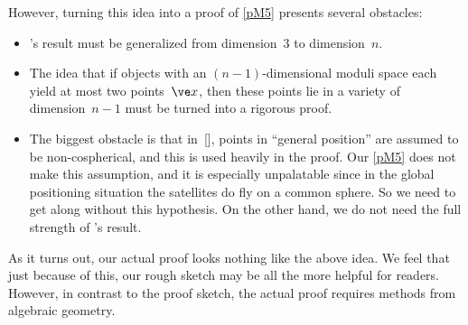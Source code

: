 \documentclass[reqno]{amsart}
\begin{document}
However, turning this idea into a proof of \cref{pM5} presents several
obstacles:

\begin{itemize}
\item {}'s result must be generalized
  from dimension~$3$ to dimension~$n$.
\item The idea that if objects with an $(n - 1)$-dimensional moduli
  space each yield at most two points~$\ve x$, then these points lie
  in a variety of dimension~$n - 1$ must be turned into a rigorous
  proof.
\item The biggest obstacle is that
  in~[], points in ``general
  position'' are assumed to be non-cospherical, and this is used
  heavily in the proof. Our \cref{pM5} does not make this assumption,
  and it is especially unpalatable since in the global positioning situation the
  satellites do fly on a common sphere. So we need to get along
  without this hypothesis. On the other hand, we do not need the full
  strength of 's result.
\end{itemize}

As it turns out, our actual proof looks nothing like the above
idea. We feel that just because of this, our rough sketch may be all
the more helpful for readers. However, in contrast to the proof
sketch, the actual proof requires methods from algebraic
geometry.
\end{document}
